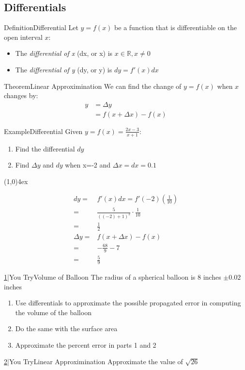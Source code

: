 \documentclass{MathNotes}
\newenvironment{example}[1]{\begin{BlueBox}{Example}{#1}}{\end{BlueBox}}
\newenvironment{definition}[1]{\begin{RedBox}{Definition}{#1}}{\end{RedBox}}
\newenvironment{theorem}[1]{\begin{GrayBox}{Theorem}{#1}}{\end{GrayBox}}
\newenvironment{practice}[2]{\begin{PurpleBox}{\texorpdfstring{#1}\Big|You Try}{#2}}{\end{PurpleBox}}
\newcommand{\br}{
	\begin{center}
		\line(1,0){4ex}
	\end{center}}
\begin{document}
\subsection{Differentials}
\begin{definition}{Differential}
	Let $y=f(x)$ be a function that is differentiable on the open interval $x$:
	\begin{itemize}
		\item The \textit{differential of x} (dx, or \Delta x) is $x\in\mathbb{R}, x\neq 0$
		\item The \textit{differential of y} (dy, or \Delta y) is $dy=f'(x)dx$
	\end{itemize}
\end{definition}
\begin{theorem}{Linear Approximination}
	We can find the change of $y=f(x)$ when $x$ changes by:
	\begin{align*}
		y & =\Delta y           \\
		  & =f(x+\Delta x)-f(x)
	\end{align*}
\end{theorem}
\begin{example}{Differential}
	Given $\displaystyle y=f(x)=\frac{2x-3}{x+1}$:
	\begin{enumerate}
		\item Find the differential $dy$\\\[\]
		\item Find $\Delta y$ and $dy$ when x=-2 and $\Delta x=dx=0.1$
	\end{enumerate}
	\br
	\begin{align*}
		dy =       & f'(x)dx=f'(-2)(\frac{1}{10})                     \\
		=          & \frac{5}{\left((-2)+1\right)^2}\cdot\frac{1}{10} \\
		=          & \frac{1}{2}                                      \\
		\Delta y = & f(x+\Delta x)-f(x)                               \\
		=          & -\frac{68}{9}-7                                  \\
		=          & \frac{5}{9}
	\end{align*}
\end{example}
\begin{practice}{\hyperref[ans:3.6-1]{1}}{Volume of Balloon}
	The radius of a spherical balloon is 8 inches $\pm 0.02$ inches
	\begin{enumerate}
		\item Use differentials to approximate the possible propagated error in computing the volume of the balloon
		\item Do the same with the surface area
		\item Approximate the percent error in parts 1 and 2
	\end{enumerate}
\end{practice}
\begin{practice}{\hyperref[ans:linear-approx]{2}}{Linear Approximination}
	\label{prac:linear-approx}
	Approximate the value of $\displaystyle\sqrt{26}$
\end{practice}
\end{document}
